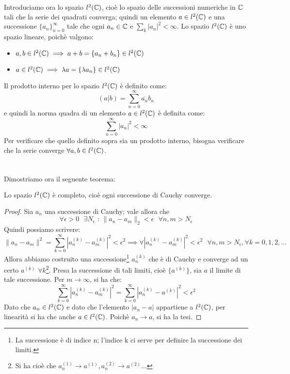 Introduciamo ora lo spazio $l^2(\mathbb{C})$, cioè lo spazio delle successioni numeriche in $\mathbb{C}$ tali che la serie dei quadrati converga; quindi un elemento  $a \in l^2(\mathbb{C})$ e una successione $\{ a_n\}_{n=0} ^{\infty}$ tale che ogni $a_n \in \mathbb{C}$ e $\sum_k |a_n|^2 < \infty$. Lo spazio $l^2(\mathbb{C})$ è uno spazio lineare, poichè valgono: 
\begin{itemize}
\item $a,b \in l^2(\mathbb{C}) \implies a+b=\{a_n + b_n\} \in l^2(\mathbb{C})$
\item $a \in l^2(\mathbb{C}) \implies \lambda a=\{ \lambda a_n\} \in l^2(\mathbb{C})$
\end{itemize}
Il prodotto interno per lo spazio $l^2(\mathbb{C})$ è definito come:
$$(a|b) = \sum_{n=0} ^{\infty} \overline{a_n} b_n$$
e quindi la norma quadra di un elemento $a \in l^2(\mathbb{C})$ è definita come:
$$\sum_{n=0} ^{\infty} |a_n|^2 < \infty$$
Per verificare che quello definito sopra sia un prodotto interno, bisogna verificare che la serie converge $\forall a,b \in l^2(\mathbb{C})$.
\\
\\
\\
Dimostriamo ora il seguente teorema:
\begin{teorema}
Lo spazio $l^2(\mathbb{C})$ è completo, cioè ogni successione di Cauchy converge.
\end{teorema}
\begin{proof}
Sia $a_n$ una successione di Cauchy; vale allora che
$$\forall \epsilon >0 \text{ } \exists N_{\epsilon} \text{ : } \|a_n-a_m\|_2 <\epsilon \text{ } \forall n,m>N_{\epsilon}$$
Quindi possiamo scrivere:
$$\|a_n-a_m\|^2= \sum_{k=0} ^{\infty} |a_n ^{(k)} - a_m ^{(k)}|^2 < \epsilon ^2 \implies \forall |a_n ^{(k)} - a_m ^{(k)}|^2 < \epsilon ^2 \text{ } \forall n,m>N_{\epsilon}, \forall k=0,1,2,\dots$$
Allora abbiamo costruito una successione\footnote{La successione è di indice n; l'indice k ci serve per definire la successione dei limiti.} $a_n ^{(k)}$ che è di Cauchy e converge ad un certo $a^{(k)}$ $\forall k$\footnote{Si ha cioè che $a_n ^{(1)} \to a^{(1)}, a_n ^{(2)} \to a^{(2)} \dots$}. Presa la successione di tali limiti, cioè $\{a^{(k)}\}$, sia $a$ il limite di tale successione. Per $m \to \infty$, si ha che:
$$\sum_{k=0} ^{\infty} |a_n ^{(k)} - a_m ^{(k)}|^2= \sum_{k=0} ^{\infty} |a_n ^{(k)} - a^{(k)}|^2 < \epsilon ^2$$
Dato che $a_n \in l^2(\mathbb{C})$ e dato che l'elemento $|a_n -a|$ appartiene a $l^2(\mathbb{C})$, per linearità si ha che  anche $a \in l^2(\mathbb{C})$. Poichè $a_n \to a$, si ha la tesi.

\end{proof}

